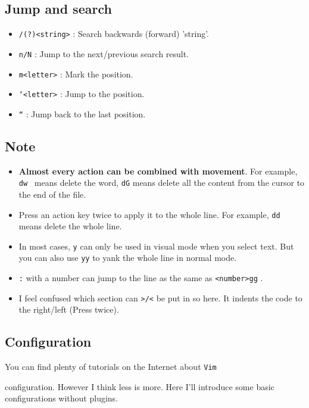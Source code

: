 \documentclass[lang=en,color=blue,12pt]{elegantbook}
\let\oldtexttt\texttt
\renewcommand{\texttt}[1]{%
  \begingroup
  \setlength{\fboxsep}{1pt}%
  \colorbox{gray!10}{\oldtexttt{#1}}%
  \endgroup
}
\begin{document}
\subsection*{Jump and search}

\begin{itemize}[itemsep=0pt, parsep=0pt, topsep=0pt, partopsep=0pt]
\item \texttt{/(?)<string>}: Search backwards (forward) 'string'.
\item \texttt{n/N}: Jump to the next/previous search result.
\item \texttt{m<letter>}: Mark the position.
\item \texttt{`<letter>}: Jump to the position.
\item \texttt{``}: Jump back to the last position.
\end{itemize}

\subsection{Note}

\begin{itemize}[itemsep=0pt, parsep=0pt, topsep=0pt, partopsep=0pt]
\item \textbf{Almost every action can be combined with movement}. For example,
\texttt{dw}\ means delete the word, \texttt{dG} means delete all the
content from the cursor to the end of the file.
\item Press an action key twice to apply it to the whole line. For
example, \texttt{dd} means delete the whole line.
\item In most cases, \texttt{y} can only be used in visual mode when you
select text. But you can also use \texttt{yy} to yank the whole line in
normal mode.
\item \texttt{:} with a number can jump to the line as the same as 
\texttt{<number>gg}.
\item I feel confused which section can \texttt{>/<} be put in so here. 
It indents the code to the right/left (Press twice).
\end{itemize}

\subsection{Configuration}

You can find plenty of tutorials on the Internet about \texttt{Vim}
configuration. However I think less is more. Here I'll introduce some
basic configurations without plugins.
\end{document}
